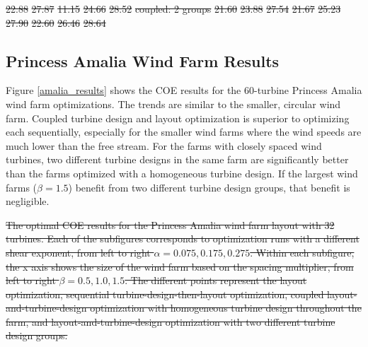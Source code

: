 \documentclass[wes, manuscript]{copernicus}
\providecommand{\DIFdel}[1]{{\protect\color{red}\sout{#1}}}                      %
\providecommand{\DIFdelbegin}{} %
\providecommand{\DIFdelend}{} %
\providecommand{\DIFdelFL}[1]{\DIFdel{#1}} %
\begin{document}
\DIFdelFL{22.88  }%
\DIFdelFL{27.87 }%
\DIFdelFL{11.15 }%
\DIFdelFL{24.66 }%
\DIFdelFL{28.52 }%
\DIFdelFL{coupled: 2 groups }%
\DIFdelFL{21.60  }%
\DIFdelFL{23.88  }%
\DIFdelFL{27.54 }%
\DIFdelFL{21.67  }%
\DIFdelFL{25.23  }%
\DIFdelFL{27.90 }%
\DIFdelFL{22.60 }%
\DIFdelFL{26.46  }%
\DIFdelFL{28.64}%

\DIFdelend \subsection{Princess Amalia Wind Farm Results}

Figure \ref{amalia_results} shows the COE results for the 60-turbine Princess Amalia wind farm optimizations.  The trends are similar to the smaller, circular wind farm. Coupled turbine design and layout optimization is superior to optimizing each sequentially, especially for the smaller wind farms where the wind speeds are much lower than the free stream. For the farms with closely spaced wind turbines, two different turbine designs in the same farm are significantly better than the farms optimized with a homogeneous turbine design. If the largest wind farms ($\beta=1.5$) benefit from two different turbine design groups, that benefit is negligible. \DIFdelbegin %

{%
\DIFdelFL{The optimal COE results for the Princess Amalia wind farm layout with 32 turbines. Each of the subfigures corresponds to optimization runs with a different shear exponent, from left to right $\alpha=0.075,0.175,0.275$. Within each subfigure, the x axis shows the size of the wind farm based on the spacing multiplier, from left to right $\beta=0.5,1.0,1.5$. The different points represent the layout optimization, sequential turbine-design-then-layout optimization, coupled layout-and-turbine-design optimization with homogeneous turbine design throughout the farm, and layout-and-turbine-design optimization with two different turbine design groups.}}
\end{document}
